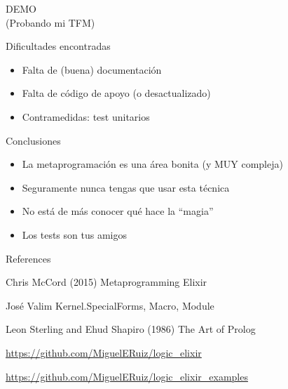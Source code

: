 \documentclass[14pt,aspectratio=169]{beamer}
\begin{document}
\begin{frame}
  \centering
  \huge
  DEMO\\
  \large
  (Probando mi TFM)
\end{frame}

\begin{frame}{Dificultades encontradas}
  \begin{itemize}
    \item Falta de (buena) documentación
    \item Falta de código de apoyo (o desactualizado)
    \item Contramedidas: test unitarios
  \end{itemize}
\end{frame}

\begin{frame}{Conclusiones}
  \begin{itemize}
    \item La metaprogramación es una área bonita (y MUY compleja)
    \item Seguramente nunca tengas que usar esta técnica
    \item No está de más conocer qué hace la ``magia''
    \item Los tests son tus amigos
  \end{itemize}
\end{frame}

\begin{frame}{References}
  \begin{thebibliography}{99} %
     Chris McCord (2015)
    \newblock Metaprogramming Elixir
  \end{thebibliography}
  \begin{thebibliography}{99} %
     José Valim
    \newblock Kernel.SpecialForms, Macro, Module
  \end{thebibliography}
  \begin{thebibliography}{99}
     Leon Sterling and Ehud Shapiro (1986)
    \newblock The Art of Prolog
  \end{thebibliography}
  \begin{thebibliography}{99}
     \url{https://github.com/MiguelERuiz/logic\_elixir}
  \end{thebibliography}
  \begin{thebibliography}{99}
     \url{https://github.com/MiguelERuiz/logic\_elixir\_examples}
  \end{thebibliography}
\end{frame}
\end{document}
